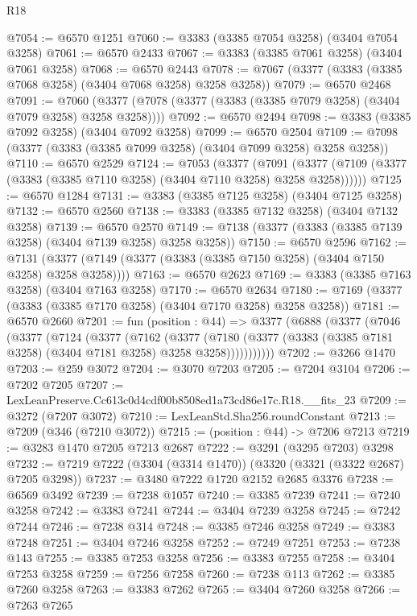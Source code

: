 \begin{lexlean}{R18}
\begin{coremodule}
@7054 := @6570 @1251
@7060 := @3383 (@3385 @7054 @3258) (@3404 @7054 @3258)
@7061 := @6570 @2433
@7067 := @3383 (@3385 @7061 @3258) (@3404 @7061 @3258)
@7068 := @6570 @2443
@7078 := @7067 (@3377 (@3383 (@3385 @7068 @3258) (@3404 @7068 @3258) @3258 @3258))
@7079 := @6570 @2468
@7091 := @7060 (@3377 (@7078 (@3377 (@3383 (@3385 @7079 @3258) (@3404 @7079 @3258) @3258 @3258))))
@7092 := @6570 @2494
@7098 := @3383 (@3385 @7092 @3258) (@3404 @7092 @3258)
@7099 := @6570 @2504
@7109 := @7098 (@3377 (@3383 (@3385 @7099 @3258) (@3404 @7099 @3258) @3258 @3258))
@7110 := @6570 @2529
@7124 := @7053
    (@3377
      (@7091 (@3377 (@7109 (@3377 (@3383 (@3385 @7110 @3258) (@3404 @7110 @3258) @3258 @3258))))))
@7125 := @6570 @1284
@7131 := @3383 (@3385 @7125 @3258) (@3404 @7125 @3258)
@7132 := @6570 @2560
@7138 := @3383 (@3385 @7132 @3258) (@3404 @7132 @3258)
@7139 := @6570 @2570
@7149 := @7138 (@3377 (@3383 (@3385 @7139 @3258) (@3404 @7139 @3258) @3258 @3258))
@7150 := @6570 @2596
@7162 := @7131 (@3377 (@7149 (@3377 (@3383 (@3385 @7150 @3258) (@3404 @7150 @3258) @3258 @3258))))
@7163 := @6570 @2623
@7169 := @3383 (@3385 @7163 @3258) (@3404 @7163 @3258)
@7170 := @6570 @2634
@7180 := @7169 (@3377 (@3383 (@3385 @7170 @3258) (@3404 @7170 @3258) @3258 @3258))
@7181 := @6570 @2660
@7201 := fun (position : @44) =>
  @3377
    (@6888
      (@3377
        (@7046
          (@3377
            (@7124
              (@3377
                (@7162
                  (@3377
                    (@7180
                      (@3377 (@3383 (@3385 @7181 @3258) (@3404 @7181 @3258) @3258 @3258)))))))))))
@7202 := @3266 @1470
@7203 := @259 @3072
@7204 := @3070 @7203
@7205 := @7204 @3104
@7206 := @7202 @7205
@7207 := LexLeanPreserve.Cc613c0d4cdf00b8508ed1a73cd86e17c.R18.__fits_23
@7209 := @3272 (@7207 @3072)
@7210 := LexLeanStd.Sha256.roundConstant
@7213 := @7209 (@346 (@7210 @3072))
@7215 := (position : @44) -> @7206 @7213
@7219 := @3283 @1470 @7205 @7213 @2687
@7222 := @3291 (@3295 @7203) @3298
@7232 := @7219 @7222 (@3304 (@3314 @1470)) (@3320 (@3321 (@3322 @2687) @7205 @3298))
@7237 := @3480 @7222 @1720 @2152 @2685 @3376
@7238 := @6569 @3492
@7239 := @7238 @1057
@7240 := @3385 @7239
@7241 := @7240 @3258
@7242 := @3383 @7241
@7244 := @3404 @7239 @3258
@7245 := @7242 @7244
@7246 := @7238 @314
@7248 := @3385 @7246 @3258
@7249 := @3383 @7248
@7251 := @3404 @7246 @3258
@7252 := @7249 @7251
@7253 := @7238 @143
@7255 := @3385 @7253 @3258
@7256 := @3383 @7255
@7258 := @3404 @7253 @3258
@7259 := @7256 @7258
@7260 := @7238 @113
@7262 := @3385 @7260 @3258
@7263 := @3383 @7262
@7265 := @3404 @7260 @3258
@7266 := @7263 @7265

\end{coremodule}
\end{lexlean}
